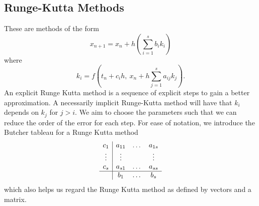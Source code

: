 \documentclass{report}
\theoremstyle{exampstyle} \newtheorem{example}[theorem]{Example}
\theoremstyle{exampstyle} \newtheorem{remark}[theorem]{Remark}
\theoremstyle{exampstyle} \newtheorem{definition}[theorem]{Definition}
\theoremstyle{exampstyle} \newtheorem{lemma}[theorem]{Lemma}
\begin{document}
\subsection{Runge-Kutta Methods}

These are methods of the form
\begin{equation*}
	x_{n+1} = x_n + h(\sum_{i = 1}^{s} b_i k_i )
\end{equation*}
where
\begin{equation*}
	k_i = f(t_n + c_i h,~ x_n + h\sum_{j = 1}^{s} a_{ij}k_j).	
\end{equation*}
An explicit Runge Kutta method is a sequence of explicit steps to gain a better approximation.
A necessarily implicit Runge-Kutta method will have that $k_i$ depends on $k_j$ for $j > i$. 
We aim to choose the parameters such that we can reduce the order of the error for each step.
For ease of notation, we introduce the Butcher tableau for a Runge Kutta method
\begin{equation*}
	\begin{array}{c|ccc}
		c_1  &a_{11} &\dots &a_{1s} \\
		\vdots &\vdots & &\vdots \\
		c_s &a_{s1} &\dots &a_{ss} \\
		\hline
		&b_1 &\dots &b_s
	\end{array}
\end{equation*}
which also helps us regard the Runge Kutta method as defined by vectors and a matrix.
\end{document}
